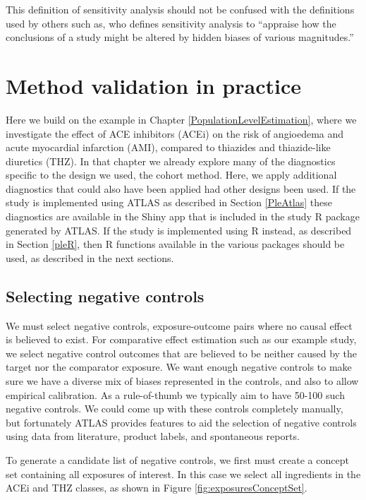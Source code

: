 \documentclass[11pt]{book}
\theoremstyle{definition}
\theoremstyle{definition}
\theoremstyle{definition}
\theoremstyle{remark}
\begin{document}
This definition of sensitivity analysis should not be confused with the definitions used by others such as, \citet{rosenbaum_2005} who defines sensitivity analysis to ``appraise how the conclusions of a study might be altered by hidden biases of various magnitudes.''

\hypertarget{method-validation-in-practice}{%
\section{Method validation in practice}\label{method-validation-in-practice}}

Here we build on the example in Chapter \ref{PopulationLevelEstimation}, where we investigate the effect of ACE inhibitors (ACEi) on the risk of angioedema and acute myocardial infarction (AMI), compared to thiazides and thiazide-like diuretics (THZ). In that chapter we already explore many of the diagnostics specific to the design we used, the cohort method. Here, we apply additional diagnostics that could also have been applied had other designs been used. If the study is implemented using ATLAS as described in Section \ref{PleAtlas} these diagnostics are available in the Shiny app that is included in the study R package generated by ATLAS. If the study is implemented using R instead, as described in Section \ref{pleR}, then R functions available in the various packages should be used, as described in the next sections.

\hypertarget{selecting-negative-controls}{%
\subsection{Selecting negative controls}\label{selecting-negative-controls}}

We must select negative controls, exposure-outcome pairs where no causal effect is believed to exist. For comparative effect estimation such as our example study, we select negative control outcomes that are believed to be neither caused by the target nor the comparator exposure. We want enough negative controls to make sure we have a diverse mix of biases represented in the controls, and also to allow empirical calibration. As a rule-of-thumb we typically aim to have 50-100 such negative controls. We could come up with these controls completely manually, but fortunately ATLAS provides features to aid the selection of negative controls using data from literature, product labels, and spontaneous reports.

To generate a candidate list of negative controls, we first must create a concept set containing all exposures of interest. In this case we select all ingredients in the ACEi and THZ classes, as shown in Figure \ref{fig:exposuresConceptSet}.
\end{document}
